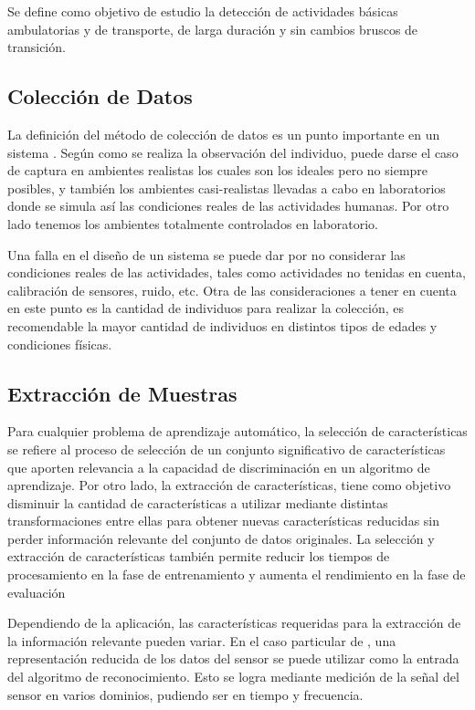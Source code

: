 Se define como objetivo de estudio la detección de actividades básicas
ambulatorias y de transporte, de larga duración y sin cambios bruscos
de transición.

\subsection{Colección de Datos}

La definición del método de colección de datos es un punto importante
en un sistema . Según como se realiza la observación del
individuo, puede darse el caso de captura en ambientes realistas los
cuales son los ideales pero no siempre posibles, y también los ambientes
casi-realistas llevadas a cabo en laboratorios donde se simula así
las condiciones reales de las actividades humanas. Por otro lado tenemos
los ambientes totalmente controlados en laboratorio.

Una falla en el diseño de un sistema  se puede dar por
no considerar las condiciones reales de las actividades, tales como
actividades no tenidas en cuenta, calibración de sensores, ruido,
etc. Otra de las consideraciones a tener en cuenta en este punto es
la cantidad de individuos para realizar la colección, es recomendable
la mayor cantidad de individuos en distintos tipos de edades y condiciones
físicas.

\subsection{Extracción de Muestras}

Para cualquier problema de aprendizaje automático, la selección de
características se refiere al proceso de selección de un conjunto
significativo de características que aporten relevancia a la capacidad
de discriminación en un algoritmo de aprendizaje. Por otro lado, la
extracción de características, tiene como objetivo disminuir la cantidad
de características a utilizar mediante distintas transformaciones
entre ellas para obtener nuevas características reducidas sin perder
información relevante del conjunto de datos originales. La selección
y extracción de características también permite reducir los tiempos
de procesamiento en la fase de entrenamiento y aumenta el rendimiento
en la fase de evaluación

Dependiendo de la aplicación, las características requeridas para
la extracción de la información relevante pueden variar. En el caso
particular de , una representación reducida de los datos
del sensor se puede utilizar como la entrada del algoritmo de reconocimiento.
Esto se logra mediante medición de la señal del sensor en varios dominios,
pudiendo ser en tiempo y frecuencia.

